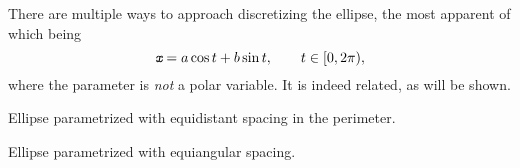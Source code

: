 There are multiple ways to approach discretizing the ellipse, the most apparent of which being
\begin{equation}\label{eq:parametric_ellipse}
  {\textit{\texttt{x}}} = a\cos{t} + b\sin{t}, \qquad t \in [0, 2\pi),
\end{equation}
where the parameter is \emph{not} a polar variable.
It is indeed related, as will be shown.
\begin{Figure}
  \centering
  \scalebox{1}{%
    
  }
  \captionsetup{type = figure}
  \caption{Ellipse parametrized with equidistant spacing in the perimeter.}
\end{Figure}
\begin{Figure}
  \centering
  \scalebox{1}{%
    
  }
  \captionsetup{type = figure}
  \caption{Ellipse parametrized with equiangular spacing.}
\end{Figure}
